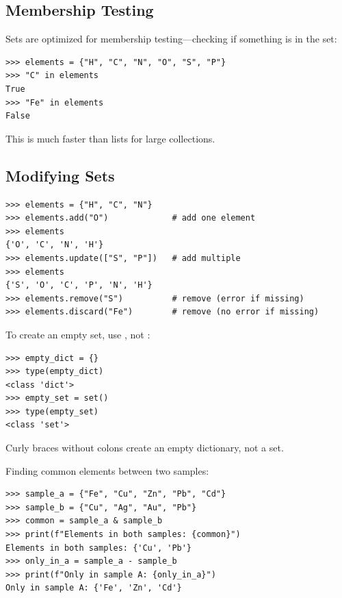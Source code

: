 \subsection{Membership Testing}

Sets are optimized for membership testing---checking if something is in the set:

\begin{lstlisting}
>>> elements = {"H", "C", "N", "O", "S", "P"}
>>> "C" in elements
True
>>> "Fe" in elements
False
\end{lstlisting}

This is much faster than lists for large collections.

\subsection{Modifying Sets}

\begin{lstlisting}
>>> elements = {"H", "C", "N"}
>>> elements.add("O")             # add one element
>>> elements
{'O', 'C', 'N', 'H'}
>>> elements.update(["S", "P"])   # add multiple
>>> elements
{'S', 'O', 'C', 'P', 'N', 'H'}
>>> elements.remove("S")          # remove (error if missing)
>>> elements.discard("Fe")        # remove (no error if missing)
\end{lstlisting}

\begin{note}
To create an empty set, use , not \py{\{\}}:
\begin{lstlisting}
>>> empty_dict = {}
>>> type(empty_dict)
<class 'dict'>
>>> empty_set = set()
>>> type(empty_set)
<class 'set'>
\end{lstlisting}
Curly braces without colons create an empty dictionary, not a set.
\end{note}

\begin{labexample}
Finding common elements between two samples:
\begin{lstlisting}
>>> sample_a = {"Fe", "Cu", "Zn", "Pb", "Cd"}
>>> sample_b = {"Cu", "Ag", "Au", "Pb"}
>>> common = sample_a & sample_b
>>> print(f"Elements in both samples: {common}")
Elements in both samples: {'Cu', 'Pb'}
>>> only_in_a = sample_a - sample_b
>>> print(f"Only in sample A: {only_in_a}")
Only in sample A: {'Fe', 'Zn', 'Cd'}
\end{lstlisting}
\end{labexample}

